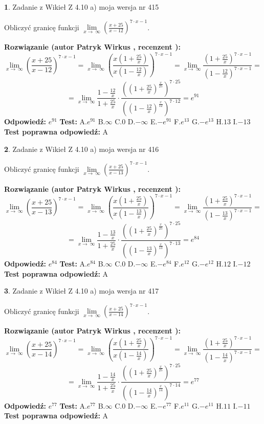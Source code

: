 \documentclass[12pt, a4paper]{article}
\theoremstyle{definition} %
\newtheorem{zad}{}
\newcommand{\zadStart}[1]{\begin{zad}#1\newline}
\newcommand{\zadStop}{\end{zad}}
\newcommand{\rozwStart}[2]{\noindent \textbf{Rozwiązanie (autor #1 , recenzent #2): }\newline}
\newcommand{\rozwStop}{\newline}
\newcommand{\odpStart}{\noindent \textbf{Odpowiedź:}\newline}
\newcommand{\odpStop}{\newline}
\newcommand{\testStart}{\noindent \textbf{Test:}\newline}
\newcommand{\testStop}{\newline}
\newcommand{\kluczStart}{\noindent \textbf{Test poprawna odpowiedź:}\newline}
\newcommand{\kluczStop}{\newline}
\begin{document}
\zadStart{Zadanie z Wikieł Z 4.10 a) moja wersja nr 415}

Obliczyć granicę funkcji  $\lim\limits_{x\to\ \infty}(\frac{x+25}{x-12})^{7\cdot x-1}$.
\zadStop
\rozwStart{Patryk Wirkus}{}
$$\lim\limits_{x\to\ \infty}(\frac{x+25}{x-12})^{7\cdot x-1} = \lim\limits_{x\to\ \infty}(\frac{x(1+\frac{25}{x})}{x(1-\frac{12}{x})})^{7\cdot x-1}=\lim\limits_{x\to\ \infty}\frac{(1+\frac{25}{x})^{7\cdot x-1}}{(1-\frac{12}{x})^{7\cdot x-1}}=$$
$$=\lim\limits_{x\to\ \infty}\frac{1-\frac{12}{x}}{1+\frac{25}{x}}\cdot\frac{((1+\frac{25}{x})^{\frac{x}{25}})^{7\cdot25}}{((1-\frac{12}{x})^{\frac{x}{12}})^{7\cdot12}}=e^{91}$$
\rozwStop
\odpStart
$e^{91}$
\odpStop
\testStart
A.$e^{91}$ B.$\infty$ C.$0$ D.$-\infty$ E.$-e^{91}$
F.$e^{13}$ G.$-e^{13}$
H.$13$
I.$-13$
\testStop
\kluczStart
A
\kluczStop



\zadStart{Zadanie z Wikieł Z 4.10 a) moja wersja nr 416}

Obliczyć granicę funkcji  $\lim\limits_{x\to\ \infty}(\frac{x+25}{x-13})^{7\cdot x-1}$.
\zadStop
\rozwStart{Patryk Wirkus}{}
$$\lim\limits_{x\to\ \infty}(\frac{x+25}{x-13})^{7\cdot x-1} = \lim\limits_{x\to\ \infty}(\frac{x(1+\frac{25}{x})}{x(1-\frac{13}{x})})^{7\cdot x-1}=\lim\limits_{x\to\ \infty}\frac{(1+\frac{25}{x})^{7\cdot x-1}}{(1-\frac{13}{x})^{7\cdot x-1}}=$$
$$=\lim\limits_{x\to\ \infty}\frac{1-\frac{13}{x}}{1+\frac{25}{x}}\cdot\frac{((1+\frac{25}{x})^{\frac{x}{25}})^{7\cdot25}}{((1-\frac{13}{x})^{\frac{x}{13}})^{7\cdot13}}=e^{84}$$
\rozwStop
\odpStart
$e^{84}$
\odpStop
\testStart
A.$e^{84}$ B.$\infty$ C.$0$ D.$-\infty$ E.$-e^{84}$
F.$e^{12}$ G.$-e^{12}$
H.$12$
I.$-12$
\testStop
\kluczStart
A
\kluczStop



\zadStart{Zadanie z Wikieł Z 4.10 a) moja wersja nr 417}

Obliczyć granicę funkcji  $\lim\limits_{x\to\ \infty}(\frac{x+25}{x-14})^{7\cdot x-1}$.
\zadStop
\rozwStart{Patryk Wirkus}{}
$$\lim\limits_{x\to\ \infty}(\frac{x+25}{x-14})^{7\cdot x-1} = \lim\limits_{x\to\ \infty}(\frac{x(1+\frac{25}{x})}{x(1-\frac{14}{x})})^{7\cdot x-1}=\lim\limits_{x\to\ \infty}\frac{(1+\frac{25}{x})^{7\cdot x-1}}{(1-\frac{14}{x})^{7\cdot x-1}}=$$
$$=\lim\limits_{x\to\ \infty}\frac{1-\frac{14}{x}}{1+\frac{25}{x}}\cdot\frac{((1+\frac{25}{x})^{\frac{x}{25}})^{7\cdot25}}{((1-\frac{14}{x})^{\frac{x}{14}})^{7\cdot14}}=e^{77}$$
\rozwStop
\odpStart
$e^{77}$
\odpStop
\testStart
A.$e^{77}$ B.$\infty$ C.$0$ D.$-\infty$ E.$-e^{77}$
F.$e^{11}$ G.$-e^{11}$
H.$11$
I.$-11$
\testStop
\kluczStart
A
\kluczStop
\end{document}
